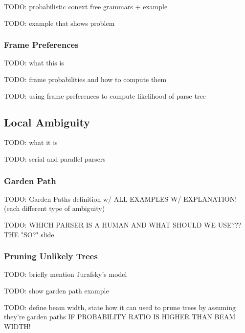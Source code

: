 \documentclass{article}
\begin{document}
TODO: probabilistic conext free grammars + example

TODO: example that shows problem

\subsubsection{Frame Preferences}

TODO: what this is

TODO: frame probabilities and how to compute them

TODO: using frame preferences to compute likelihood of parse tree

\subsection{Local Ambiguity}

TODO: what it is

TODO: serial and parallel parsers

\subsubsection{Garden Path}

TODO: Garden Paths definition w/ ALL EXAMPLES W/ EXPLANATION!
	(each different type of ambiguity)

TODO: WHICH PARSER IS A HUMAN AND WHAT SHOULD WE USE??? THE "SO?" slide

\subsubsection{Pruning Unlikely Trees}

TODO: briefly mention Jurafsky's model

TODO: show garden path example

TODO: define beam width, state how it can used to prune trees by assuming they're garden paths IF PROBABILITY RATIO IS HIGHER THAN BEAM WIDTH!
\end{document}
